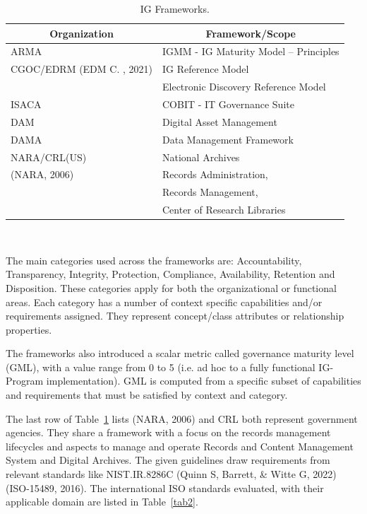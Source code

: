 \documentclass[runningheads]{llncs}
\begin{document}
\begin{table}
\caption{IG Frameworks.}\label{tab1}
\begin{tabular}[0.5\textwidth,center]{|l|l|}
\multicolumn{1}{c}{\textbf{Organization}} & \multicolumn{1}{c}{\textbf{Framework/Scope}}\\ \hline
ARMA & IGMM - IG Maturity Model – Principles \\  \hline
CGOC/EDRM (EDM C. , 2021) & IG Reference Model\\
     & Electronic Discovery Reference Model\\ \hline
ISACA & COBIT - IT Governance Suite\\ \hline
DAM & Digital Asset Management\\ \hline
DAMA  & Data Management Framework\\ \hline
NARA/CRL(US) & National Archives\\
(NARA, 2006) & Records Administration, \\
             & Records Management, \\
             & Center of Research Libraries \\ \hline
\end{tabular}
\end{table} 
\,  %

The main categories used across the frameworks are: Accountability, Transparency, Integrity, Protection, Compliance, Availability, Retention and Disposition. These categories apply for both the organizational or functional areas. Each category has a number of context specific capabilities and/or requirements assigned. They represent concept/class attributes or relationship properties. 

The frameworks also introduced a scalar metric called governance maturity level (GML), with a value range from 0 to 5 (i.e. ad hoc to a fully functional IG-Program implementation). GML is computed from a specific subset of capabilities and requirements that must be satisfied by context and category. 

The last row of Table~\ref{tab1} lists (NARA, 2006) and CRL both represent government agencies. They share a framework with a focus on the records management lifecycles and aspects to manage and operate Records and Content Management System and Digital Archives. The given guidelines draw requirements from relevant standards like NIST.IR.8286C (Quinn S, Barrett, \& Witte G, 2022) (ISO-15489, 2016). The international ISO standards evaluated, with their applicable domain are listed in Table~\ref{tab2}. 
\end{document}
